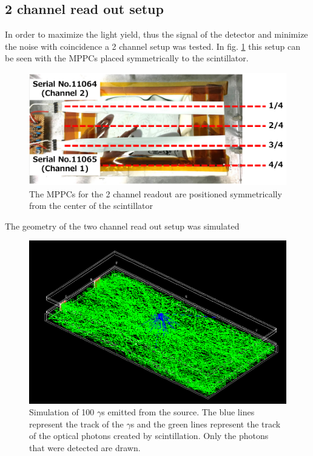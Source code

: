 \documentclass[12pt, a4paper,titlepage]{article}
\numberwithin{equation}{section}
\numberwithin{figure}{section}
\begin{document}
\pagebreak

\subsection{2 channel read out setup}

In order to maximize the light yield, thus the signal of the detector and minimize the noise with coincidence a 2 channel setup was tested.  In fig. \ref{fig:schem2c} this setup can be seen with the MPPCs placed symmetrically to the scintillator.

\begin{figure}[h!]
\centering
\includegraphics[width=130.0mm]{images/2channelsetup.png}
\caption{The MPPCs for the 2 channel readout are positioned symmetrically from the center of the scintillator}
\label{fig:schem2c}
\end{figure}

The geometry of the two channel read out setup was simulated 

\begin{figure}[h!]
\centering
\includegraphics[width=160.0mm]{images/2channel.png}
\caption{Simulation of 100 $\gamma$s emitted from the source. The blue lines represent the track of the $\gamma$s and the green lines represent the track of the optical photons created by scintillation. Only the photons that were detected are drawn.}
\label{fig:sim_setup}
\end{figure}
\end{document}
